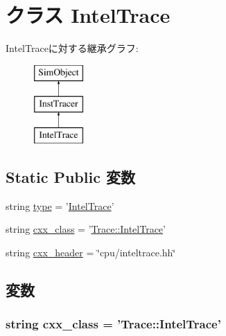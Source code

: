 \hypertarget{classIntelTrace_1_1IntelTrace}{
\section{クラス IntelTrace}
\label{classIntelTrace_1_1IntelTrace}
}
IntelTraceに対する継承グラフ:\begin{figure}[H]
\begin{center}
\leavevmode
\includegraphics[height=3cm]{classIntelTrace_1_1IntelTrace}
\end{center}
\end{figure}
\subsection*{Static Public 変数}
\begin{DoxyCompactItemize}
\item 
string \hyperlink{classIntelTrace_1_1IntelTrace_acce15679d830831b0bbe8ebc2a60b2ca}{type} = '\hyperlink{classIntelTrace_1_1IntelTrace}{IntelTrace}'
\item 
string \hyperlink{classIntelTrace_1_1IntelTrace_a58cd55cd4023648e138237cfc0822ae3}{cxx\_\-class} = '\hyperlink{classTrace_1_1IntelTrace}{Trace::IntelTrace}'
\item 
string \hyperlink{classIntelTrace_1_1IntelTrace_a17da7064bc5c518791f0c891eff05fda}{cxx\_\-header} = \char`\"{}cpu/inteltrace.hh\char`\"{}
\end{DoxyCompactItemize}


\subsection{変数}
\hypertarget{classIntelTrace_1_1IntelTrace_a58cd55cd4023648e138237cfc0822ae3}{
\subsubsection[{cxx\_\-class}]{\setlength{\rightskip}{0pt plus 5cm}string {\bf cxx\_\-class} = '{\bf Trace::IntelTrace}'}}
\label{classIntelTrace_1_1IntelTrace_a58cd55cd4023648e138237cfc0822ae3}


